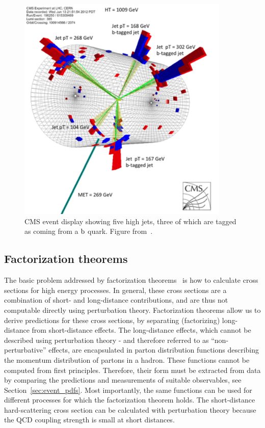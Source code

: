 \begin{figure}[p]
  \centering
  \includegraphics[width=0.9\textwidth]{figures/eventreco_event/event_display_SUS12024}
  \caption{CMS event display showing five high \pt jets, three of which are tagged as coming from a
$\mathrm{b}$ quark. Figure from~\cite{SUS12024_event_display}.
  \label{fig:event_display}}
\end{figure}


\subsection{Factorization theorems}

The basic problem addressed by factorization theorems~\cite{Collins:1989gx} is how to calculate
cross sections for high energy processes. In general, these cross sections are a combination of
short- and long-distance contributions, and are thus not computable directly using perturbation
theory.
Factorization theorems allow us to derive predictions for these cross sections,
by separating (factorizing) long-distance from short-distance effects. 
The long-distance effects, which cannot be described using perturbation theory - and therefore
referred to as “non-perturbative” effects, 
are encapsulated in parton distribution functions
describing the momentum distribution of partons in a hadron. 
These functions cannot be computed from first principles. Therefore, their form must be extracted
from data by comparing the predictions and measurements of suitable observables, see
Section~\ref{sec:event_pdfs}. Most importantly, the same functions can be used for different
processes for which the factorization theorem holds.
The short-distance hard-scattering cross section can be calculated with perturbation theory
because the QCD coupling strength is small at short distances. 


